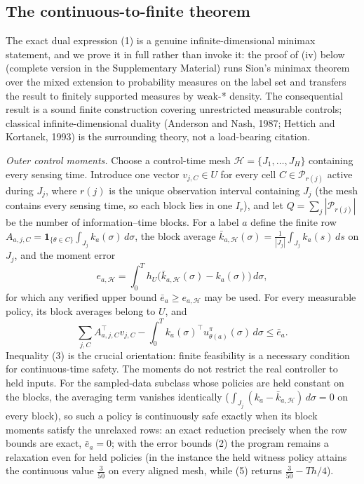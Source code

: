 \documentclass[10pt,twocolumn]{article}
\theoremstyle{plain}
\theoremstyle{definition}
\theoremstyle{remark}
\begin{document}
\subsection{The continuous-to-finite theorem}\label{bridge}

The exact dual expression (1) is a genuine infinite-dimensional minimax
statement, and we prove it in full rather than invoke it: the proof of
(iv) below (complete version in the Supplementary Material) runs Sion's
minimax theorem over the mixed extension to probability measures on the
label set and transfers the result to finitely supported measures by
weak-* density. The consequential result is a sound finite construction
covering unrestricted measurable controls; classical infinite-dimensional
duality (Anderson and Nash, 1987; Hettich and Kortanek, 1993) is the
surrounding theory, not a load-bearing citation.

\emph{Outer control moments.} Choose a control-time mesh
\(\mathcal{H} = \{J_1,\dots,J_H\}\) containing every sensing time. Introduce
one vector \(v_{j,C} \in U\) for every cell \(C \in \mathcal{P}_{r(j)}\)
active during \(J_j\), where \(r(j)\) is the unique observation interval
containing \(J_j\) (the mesh contains every sensing time, so each block
lies in one \(I_r\)), and let \(Q = \sum_j |\mathcal{P}_{r(j)}|\) be the
number of information--time blocks. For a label \(a\) define the finite row
\(A_{a,j,C} = \mathbf{1}_{\{\theta \in C\}} \int_{J_j} k_a(\sigma)\, d\sigma\),
the block average
\(\bar{k}_{a,\mathcal{H}}(\sigma) = \frac{1}{|J_j|} \int_{J_j} k_a(s)\, ds\)
on \(J_j\), and the moment error
\[
e_{a,\mathcal{H}} = \int_0^T h_U\!\bigl(\bar{k}_{a,\mathcal{H}}(\sigma)
- k_a(\sigma)\bigr)\, d\sigma,
\tag{2}
\]
for which any verified upper bound \(\bar{e}_a \ge e_{a,\mathcal{H}}\) may be
used. For every measurable policy, its block averages belong to \(U\), and
\[
\sum_{j,C} A_{a,j,C}^\top v_{j,C} - \int_0^T k_a(\sigma)^\top
u^\pi_{\theta(a)}(\sigma)\, d\sigma \le \bar{e}_a.
\tag{3}
\]
Inequality (3) is the crucial orientation: finite feasibility is a
necessary condition for continuous-time safety. The moments do not restrict
the real controller to held inputs. For the sampled-data subclass whose policies are
held constant on the blocks, the averaging term vanishes identically
(\(\int_{J_j}(k_a - \bar{k}_{a,\mathcal{H}})\, d\sigma = 0\) on every
block), so such a policy is continuously safe exactly when its block
moments satisfy the unrelaxed rows: an exact reduction precisely when the
row bounds are exact, \(\bar{e}_a = 0\); with the error bounds (2) the
program remains a relaxation even for held policies (in the instance the
held witness policy attains the continuous value \(\tfrac3{50}\) on every
aligned mesh, while (5) returns \(\tfrac3{50} - Th/4\)).
\end{document}
